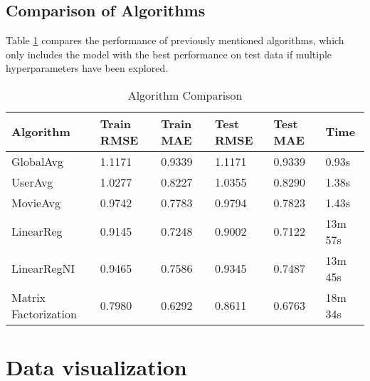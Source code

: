 \documentclass[12pt]{article}
\begin{document}
\subsection{Comparison of Algorithms}
Table \ref{tab:1.4} compares the performance of previously mentioned algorithms, which only includes the model with the best performance on test data if multiple hyperparameters have been explored.
\begin{table}[ht]
    \centering
    \caption{Algorithm Comparison}
    \label{tab:1.4}
    \begin{tabular}{llllll}
        \toprule
        \textbf{Algorithm} & \textbf{Train RMSE} & \textbf{Train MAE} & \textbf{Test RMSE} & \textbf{Test MAE} & \textbf{Time}\\
        \midrule
        GlobalAvg & 1.1171 & 0.9339 & 1.1171 & 0.9339 & 0.93s\\
        UserAvg & 1.0277 & 0.8227 & 1.0355 & 0.8290 & 1.38s\\
        MovieAvg & 0.9742 & 0.7783 & 0.9794 & 0.7823 & 1.43s\\
        LinearReg & 0.9145 & 0.7248 & 0.9002 & 0.7122 & 13m 57s\\
        LinearRegNI & 0.9465 & 0.7586 & 0.9345 & 0.7487 & 13m 45s\\
        Matrix Factorization & 0.7980 & 0.6292 & 0.8611 & 0.6763 & 18m 34s\\
        \bottomrule
    \end{tabular}
\end{table}
\section{Data visualization}
\end{document}
